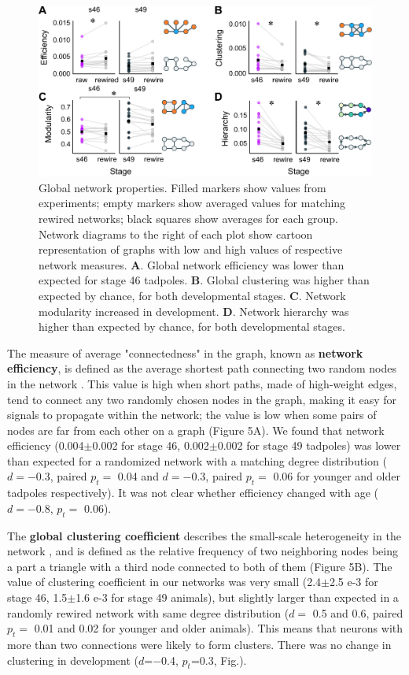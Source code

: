 \documentclass{article}
\begin{document}
\begin{figure}[t!]
\includegraphics[width=\linewidth]{fig5.pdf}
\caption{
Global network properties. Filled markers show values from experiments; empty markers show averaged values for matching rewired networks; black squares show averages for each group. Network diagrams to the right of each plot show cartoon representation of graphs with low and high values of respective network measures. \textbf{A}. Global network efficiency was lower than expected for stage 46 tadpoles. \textbf{B}. Global clustering was higher than expected by chance, for both developmental stages. \textbf{C}. Network modularity increased in development.  \textbf{D}. Network hierarchy was higher than expected by chance, for both developmental stages. }
\end{figure}

The measure of average "connectedness" in the graph, known as \textbf{network efficiency}, is defined as the average shortest path connecting two random nodes in the network \citep{latora2001efficiency, rubinov2010toolbox}. This value is high when short paths, made of high-weight edges, tend to connect any two randomly chosen nodes in the graph, making it easy for signals to propagate within the network; the value is low when some pairs of nodes are far from each other on a graph (Figure 5A). We found that network efficiency (0.004$\pm$0.002 for stage 46, 0.002$\pm$0.002 for stage 49 tadpoles) was lower than expected for a randomized network with a matching degree distribution ($d=-$0.3, paired $p_t=$ 0.04 and $d=-$0.3, paired $p_t=$ 0.06 for younger and older tadpoles respectively). It was not clear whether efficiency changed with age ($d=-$0.8, $p_t=$ 0.06).

The \textbf{global clustering coefficient} describes the small-scale heterogeneity in the network \citep{fagiolo2007}, and is defined as the relative frequency of two neighboring nodes being a part a triangle with a third node connected to both of them (Figure 5B). The value of clustering coefficient in our networks was very small (2.4$\pm$2.5 e-3 for stage 46, 1.5$\pm$1.6 e-3 for stage 49 animals), but slightly larger than expected in a randomly rewired network with same degree distribution ($d=$ 0.5 and 0.6, paired $p_t=$ 0.01 and 0.02 for younger and older animals). This means that neurons with more than two connections were likely to form clusters. There was no change in clustering in development ($d$=$-$0.4, $p_t$=0.3, Fig.).
\end{document}
